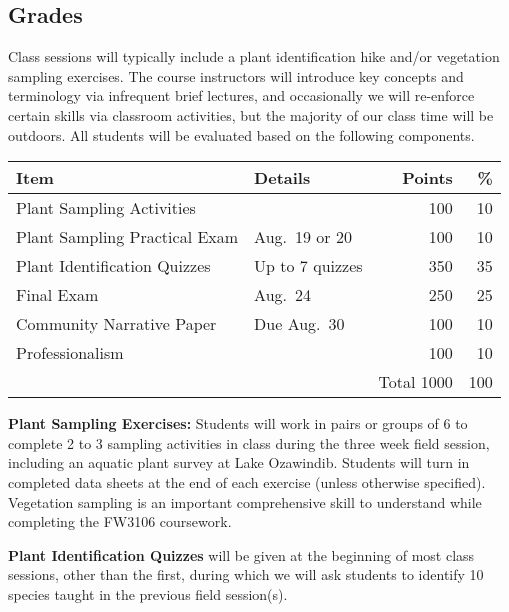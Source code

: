 \documentclass{tufte-handout}
\begin{document}
\begin{fullwidth}
\section{Grades}

Class sessions will typically include a plant identification hike and/or vegetation sampling exercises. The course instructors will introduce key concepts and terminology via infrequent brief lectures, and occasionally we will re-enforce certain skills via classroom activities, but the majority of our class time will be outdoors. All students will be evaluated based on the following components.


\begin{table}
\begin{tabular}{l l  r r}
Item & Details & Points & \% \\
\hline
Plant Sampling Activities &  & 100 & 10 \\
Plant Sampling Practical Exam & Aug.\ 19 or 20 & 100 & 10 \\
Plant Identification Quizzes & Up to 7 quizzes & 350 & 35 \\
Final Exam & Aug.\ 24 & 250  & 25 \\						%
Community Narrative Paper & Due Aug.\ 30 & 100 & 10 \\
Professionalism & & 100 & 10 \\
\hline
& & Total 1000 & 100
\end{tabular}
\end{table}

\end{fullwidth}

\textbf{Plant Sampling Exercises:} Students will work in pairs or groups of 6 to complete 2 to 3 sampling activities in class during the three week field session, including an aquatic plant survey at Lake Ozawindib. Students will turn in completed data sheets at the end of each exercise (unless otherwise specified). Vegetation sampling is an important comprehensive skill to understand while completing the FW3106 coursework. 

\textbf{Plant Identification Quizzes} will be given at the beginning of most class sessions, other than the first, during which we will ask students to identify 10 species taught in the previous field session(s). 
\end{document}

